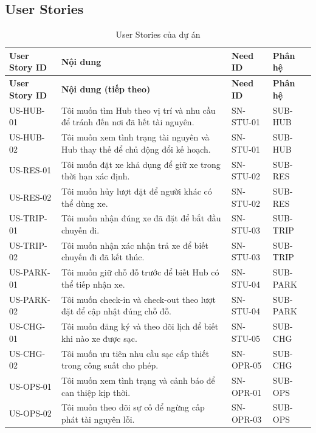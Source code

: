 \subsection{User Stories}

\begingroup
\small
\begin{longtable}{|L{22mm}|L{72mm}|L{23mm}|L{20mm}|}
  \caption{User Stories của dự án}\label{tab:user-stories}\\
  \hline
  \textbf{User Story ID} & \centering\arraybackslash\textbf{Nội dung} & \textbf{Need ID} & \textbf{Phân hệ}\\
  \hline
  \endfirsthead
  \hline
  \textbf{User Story ID} & \centering\arraybackslash\textbf{Nội dung (tiếp theo)} & \textbf{Need ID} & \textbf{Phân hệ}\\
  \hline
  \endhead
  US-HUB-01 & Tôi muốn tìm Hub theo vị trí và nhu cầu để tránh đến nơi đã hết tài nguyên. & SN-STU-01 & SUB-HUB\\
  \hline
  US-HUB-02 & Tôi muốn xem tình trạng tài nguyên và Hub thay thế để chủ động đổi kế hoạch. & SN-STU-01 & SUB-HUB\\
  \hline
  US-RES-01 & Tôi muốn đặt xe khả dụng để giữ xe trong thời hạn xác định. & SN-STU-02 & SUB-RES\\
  \hline
  US-RES-02 & Tôi muốn hủy lượt đặt để người khác có thể dùng xe. & SN-STU-02 & SUB-RES\\
  \hline
  US-TRIP-01 & Tôi muốn nhận đúng xe đã đặt để bắt đầu chuyến đi. & SN-STU-03 & SUB-TRIP\\
  \hline
  US-TRIP-02 & Tôi muốn nhận xác nhận trả xe để biết chuyến đi đã kết thúc. & SN-STU-03 & SUB-TRIP\\
  \hline
  US-PARK-01 & Tôi muốn giữ chỗ đỗ trước để biết Hub có thể tiếp nhận xe. & SN-STU-04 & SUB-PARK\\
  \hline
  US-PARK-02 & Tôi muốn check-in và check-out theo lượt đặt để cập nhật đúng chỗ đỗ. & SN-STU-04 & SUB-PARK\\
  \hline
  US-CHG-01 & Tôi muốn đăng ký và theo dõi lịch để biết khi nào xe được sạc. & SN-STU-05 & SUB-CHG\\
  \hline
  US-CHG-02 & Tôi muốn ưu tiên nhu cầu sạc cấp thiết trong công suất cho phép. & SN-OPR-05 & SUB-CHG\\
  \hline
  US-OPS-01 & Tôi muốn xem tình trạng và cảnh báo để can thiệp kịp thời. & SN-OPR-01 & SUB-OPS\\
  \hline
  US-OPS-02 & Tôi muốn theo dõi sự cố để ngừng cấp phát tài nguyên lỗi. & SN-OPR-03 & SUB-OPS\\

\end{longtable}

